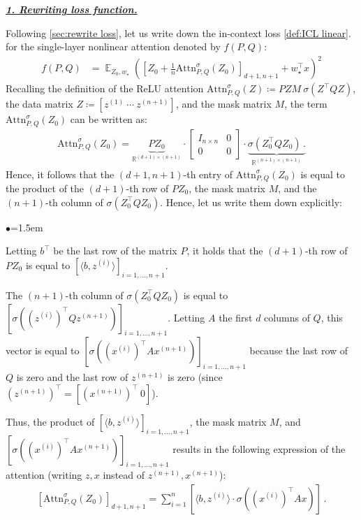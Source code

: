 \documentclass{article}
\DeclareMathOperator{\E}{\mathbb{E}}
\newcommand{\R}{\mathbb{R}}
\newcommand{\atth}{\mathrm{Attn}^\sigma}
\newcommand{\relu}{\sigma}
\renewcommand{\aa}{M}
\newcommand{\bb}{A}
\newcommand{\cc}{b}
\newcommand{\wstar}{w_\star}
\newcommand{\tz}[1]{{z^{(#1)}}}
\newcommand{\tx}[1]{x^{(#1)}}
\newcommand{\emphh}[1]{\textbf{\emph{#1}}}
\newcommand{\inpp}[2]{ \langle #1,#2\rangle}
\begin{document}
\underline{\emphh{1. Rewriting loss function.}}


Following \autoref{sec:rewrite loss}, let us write down the in-context loss  \eqref{def:ICL linear}.  for the single-layer nonlinear attention denoted by $f(P,Q)$:  
\begin{align} 
f\left(P,Q\right)  
&=\E_{Z_0,\wstar} \left( \left[Z_{0} +\frac{1}{n} \atth_{P,Q}(Z_0) \right]_{d+1,n+1} + \wstar^\top x\right)^2
\end{align} 
Recalling the definition of the ReLU attention $\atth_{P,Q}(Z) \coloneqq  P ZM \  \relu (
Z^\top Q Z)$, the data matrix $Z \coloneqq [\tz{1} \ \cdots \ \tz{n+1}]$, and the mask matrix $\aa$, the term $ \atth_{P,Q}(Z_0)$ can be written as:
\begin{align}
\atth_{P,Q}(Z_0) = \underbrace{PZ_0}_{\R^{(d+1)\times (n+1)} } \cdot  \begin{bmatrix} I_{n\times n} & 0 \\0 & 0 \end{bmatrix}  \cdot   \underbrace{\relu\left(Z_0^\top Q Z_0 \right)\,.}_{\R^{(n+1)\times (n+1)}}
\end{align}
Hence, it follows that the $(d+1, n+1)$-th entry of $\atth_{P,Q}(Z_0)$ is equal to the product of the $(d+1)$-th row of $PZ_0$, the mask matrix $\aa$, and the $(n+1)$-th column of $\relu\left(Z_0^\top Q Z_0 \right)$. Hence, let us write them down explicitly:
\begin{list}{$\bullet$}{\leftmargin=1.5em}
\setlength{\itemsep}{1pt}
\item Letting $\cc^\top$ be the last row of the matrix $P$, it holds that the $(d+1)$-th row of $PZ_0$ is equal to $[\inpp{\cc}{\tz{i}}]_{i=1,\dots,n+1}$.
\item The $(n+1)$-th column of $\relu\left(Z_0^\top Q Z_0 \right)$ is equal to $\left[\relu\left((\tz{i})^\top Q \tz{n+1} \right)  \right]_{i=1,\dots, n+1}$. Letting  $\bb$ the first $d$ columns of $Q$,  this vector is equal to $\left[\relu\left((\tx{i})^\top \bb \tx{n+1} \right) \right]_{i=1,\dots, n+1}$ because the last row of $Q$ is zero and the last row of $\tz{n+1}$ is zero (since $(\tz{n+1})^\top = [(\tx{n+1})^\top \ 0]$). 
\end{list}
Thus, the product of   $[\inpp{\cc}{\tz{i}}]_{i=1,\dots,n+1}$, the mask matrix $\aa$, and $\left[\relu\left((\tx{i})^\top \bb \tx{n+1} \right) \right]_{i=1,\dots, n+1}$ results in the following expression of the attention (writing $z,x$ instead of  $\tz{n+1},\tx{n+1}$):
\begin{align}
    \left[ \atth_{P,Q}(Z_0) \right]_{d+1,n+1}    =  \sum_{i=1}^n \left[ \inpp{\cc}{\tz{i}} \cdot \relu((\tx{i})^\top \bb x ) \right] \,.
\end{align} 
\end{document}
